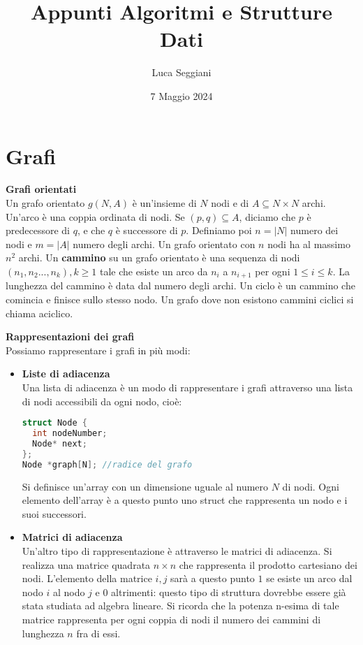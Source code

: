 \documentclass[a4paper,12pt]{article}
\title{Appunti Algoritmi e Strutture Dati}
\author{Luca Seggiani}
\date{7 Maggio 2024}
\begin{document}
\maketitle
\section{Grafi}
\par\smallskip
\textbf{Grafi orientati} \\
Un grafo orientato $g(N, A)$ è un'insieme di $N$ nodi e di $A \subseteq N \times N$ archi. Un'arco è una coppia ordinata
di nodi. Se $(p,q) \subseteq A$, diciamo che $p$ è predecessore di $q$, e che $q$ è successore di $p$. Definiamo poi $n = |N|$ numero dei nodi
e $m = |A|$ numero degli archi. Un grafo orientato con $n$ nodi ha al massimo $n^2$ archi.
Un \textbf{cammino} su un grafo orientato è una sequenza di nodi $(n_1,n_2...,n_k), k\geq 1$ tale che esiste un arco da $n_i$ a $n_{i+1}$ per ogni
$1 \leq i \leq k$. La lunghezza del cammino è data dal numero degli archi. Un ciclo è un cammino che comincia e finisce sullo stesso nodo.
Un grafo dove non esistono cammini ciclici si chiama aciclico.
\par\smallskip
\textbf{Rappresentazioni dei grafi} \\
Possiamo rappresentare i grafi in più modi:
\begin{itemize}
  \item \textbf{Liste di adiacenza} \\
    Una lista di adiacenza è un modo di rappresentare i grafi attraverso una lista di nodi accessibili da ogni nodo, cioè:
    \begin{lstlisting}[language=C++]
struct Node {
  int nodeNumber;
  Node* next;
};
Node *graph[N]; //radice del grafo
\end{lstlisting}
Si definisce un'array con un dimensione uguale al numero $N$ di nodi. Ogni elemento dell'array è a questo punto uno struct 
che rappresenta un nodo e i suoi successori.
\item \textbf{Matrici di adiacenza} \\
Un'altro tipo di rappresentazione è attraverso le matrici di adiacenza. Si realizza una matrice quadrata $n\times n$ che rappresenta
il prodotto cartesiano dei nodi. L'elemento della matrice $i,j$ sarà a questo punto $1$ se esiste un arco dal nodo $i$ al nodo $j$ e
$0$ altrimenti: questo tipo di struttura dovrebbe essere già stata studiata ad algebra lineare. Si ricorda che la potenza n-esima
di tale matrice rappresenta per ogni coppia di nodi il numero dei cammini di lunghezza $n$ fra di essi.
\end{itemize}
\end{document}

